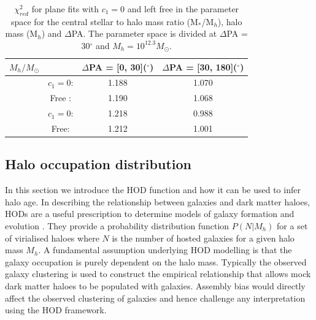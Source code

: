 \begin{table}
\centering
\begin{tabular}{|l|c|c|c|}
\hline
$M_{h}/M_{\odot}$& & $\Delta$PA = [0, 30]($^{\circ}$) & $\Delta$PA = [30, 180]($^{\circ}$) \\ \hline 
[$10^{11.7}, 10^{12.3}$] & $c_{1} = 0$: & 1.188 & 1.070 \\
					   & Free : & 1.190 & 1.068 \\ \hline
[$10^{12.3}, 10^{14}$]   & $c_{1} = 0$: & 1.218 & 0.988 \\ 
					   & Free: & 1.212 & 1.001 \\ \hline
\end{tabular}
\caption{$\chi_{red}^2$ for plane fits with $c_1 = 0$ and left free in the parameter space for the central stellar to halo mass ratio (M$_{\ast}$/M$_{h}$), halo mass (M$_{h}$) and $\Delta$PA. The parameter space is divided at $\Delta$PA = 30$^{\circ}$ and $M_{h} = 10^{12.3}M_{\odot}$.}
\label{tab:chisq}
\end{table}

\subsection{Halo occupation distribution} \label{sec:HOD_hab}
In this section we introduce the HOD function and how it can be used to infer halo age. In describing the relationship between galaxies and dark matter haloes, HODs are a useful prescription to determine models of galaxy formation and evolution \citep[e.g.][]{berlind2003}. They provide a probability distribution function $P(N|M_h)$ for a set of virialised haloes where $N$ is the number of hosted galaxies for a given halo mass $M_h$. A fundamental assumption underlying HOD modelling is that the galaxy occupation is purely dependent on the halo mass. Typically the observed galaxy clustering is used to construct the empirical relationship that allows mock dark matter haloes to be populated with galaxies. Assembly bias would directly affect the observed clustering of galaxies and hence challenge any interpretation using the HOD framework. 

